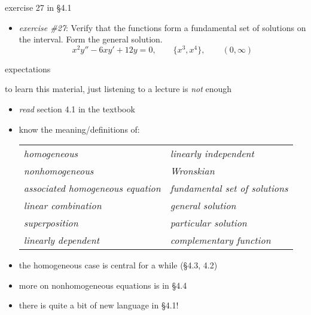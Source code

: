\documentclass{beamer}
\begin{document}
\begin{frame}{exercise 27 in \S 4.1}

\begin{itemize}
\item \emph{exercise \#27}:  Verify that the functions form a fundamental set  of solutions on the interval.  Form the general solution.
    $$x^2 y''-6xy'+12y=0, \qquad \{x^3,x^4\}, \qquad (0,\infty)$$
\end{itemize}

\vspace{50mm}
\end{frame}


\begin{frame}{expectations}

to learn this material, just listening to a lecture is \emph{not} enough
\begin{itemize}
     \item \emph{read} section 4.1 in the textbook
         \item know the meaning/definitions of:

\bigskip
             \hspace{-10mm} \begin{tabular}{ll}
             \emph{homogeneous}                     & \emph{linearly independent} \\
             \emph{nonhomogeneous}                  & \emph{Wronskian} \\
             \emph{associated homogeneous equation} & \emph{fundamental set of solutions} \\
             \emph{linear combination}              & \emph{general solution} \\
             \emph{superposition}                   & \emph{particular solution} \\
             \emph{linearly dependent}              & \emph{complementary function}                          
             \end{tabular}

\bigskip
         \item the homogeneous case is central for a while (\S4.3, 4.2)
         \item more on nonhomogeneous equations is in \S4.4
         \item there is quite a bit of new language in \S4.1!
\end{itemize}
\end{frame}
\end{document}
